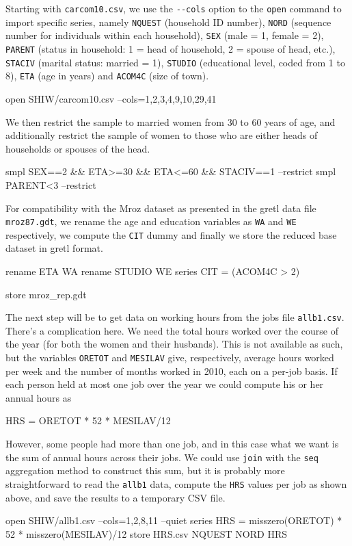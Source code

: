 Starting with \texttt{carcom10.csv}, we use the \verb|--cols| option
to the \texttt{open} command to import specific series, namely
\texttt{NQUEST} (household ID number), \texttt{NORD} (sequence number
for individuals within each household), \texttt{SEX} (male = 1, female
= 2), \texttt{PARENT} (status in household: 1 = head of household, 2 =
spouse of head, etc.), \texttt{STACIV} (marital status: married = 1),
\texttt{STUDIO} (educational level, coded from 1 to 8),
\texttt{ETA} (age in years) and \texttt{ACOM4C} (size of town).
%
\begin{code}
open SHIW/carcom10.csv --cols=1,2,3,4,9,10,29,41
\end{code}
%
We then restrict the sample to married women from 30 to 60 years of
age, and additionally restrict the sample of women to those who are
either heads of households or spouses of the head.
%
\begin{code}
smpl SEX==2 && ETA>=30 && ETA<=60 && STACIV==1 --restrict
smpl PARENT<3  --restrict
\end{code}
%
For compatibility with the Mroz dataset as presented in the gretl
data file \texttt{mroz87.gdt}, we rename the age and education
variables as \texttt{WA} and \texttt{WE} respectively, we compute the
\texttt{CIT} dummy and finally we
store the reduced base dataset in gretl format.
%
\begin{code}
rename ETA WA
rename STUDIO WE
series CIT = (ACOM4C > 2)

store mroz_rep.gdt
\end{code}

The next step will be to get data on working hours from the jobs file
\texttt{allb1.csv}. There's a complication here. We need the total
hours worked over the course of the year (for both the women and their
husbands). This is not available as such, but the variables
\texttt{ORETOT} and \texttt{MESILAV} give, respectively, average hours
worked per week and the number of months worked in 2010, each on a
per-job basis. If each person held at most one job over the year we
could compute his or her annual hours as
\begin{code}
HRS = ORETOT * 52 * MESILAV/12
\end{code}
However, some people had more than one job, and in this case what we
want is the sum of annual hours across their jobs.  We could use
\texttt{join} with the \texttt{seq} aggregation method to construct
this sum, but it is probably more straightforward to read the
\texttt{allb1} data, compute the \texttt{HRS} values per job as shown
above, and save the results to a temporary CSV file.
%
\begin{code}
open SHIW/allb1.csv --cols=1,2,8,11 --quiet
series HRS = misszero(ORETOT) * 52 * misszero(MESILAV)/12
store HRS.csv NQUEST NORD HRS
\end{code}

